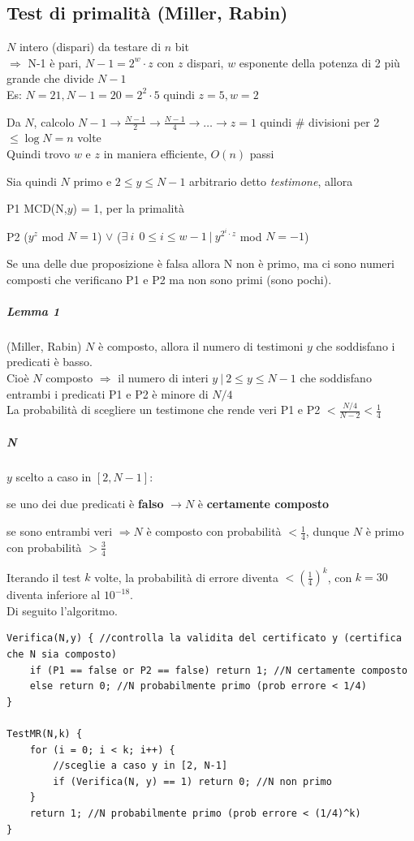 \documentclass[10pt]{book}
\begin{document}
\subsection{Test di primalità (Miller, Rabin)}
\begin{list}{}{}
	\item $N$ intero (dispari) da testare di $n$ bit\\
	$\Rightarrow$ N-1 è pari, $N-1 = 2^w \cdot z$ con $z$ dispari, $w$ esponente della potenza di 2 più grande che divide $N-1$\\
	Es: $N=21, N-1=20 = 2^2\cdot 5$ quindi $z=5, w=2$
	\item Da $N$, calcolo $N-1\rightarrow\frac{N-1}{2}\rightarrow\frac{N-1}{4}\rightarrow\ldots\rightarrow z = 1$ quindi \# divisioni per 2 $\leq\log N = n$ volte\\
	Quindi trovo $w$ e $z$ in maniera efficiente, $O(n)$ passi
	\item Sia quindi $N$ primo e $2\leq y \leq N-1$ arbitrario detto \textit{testimone}, allora
	\begin{list}{}{}
		\item[P1] MCD(N,$y$) = 1, per la primalità
		\item[P2] ($y^z$ mod $N = 1$) $\vee$ ($\exists\:i\:\:0\leq i \leq w-1\:|\:y^{2^i \cdot z}$ mod $N = -1$)
	\end{list}
	Se una delle due proposizione è falsa allora N non è primo, ma ci sono numeri composti che verificano P1 e P2 ma non sono primi (sono pochi).
\end{list}
\subparagraph{Lemma 1} (Miller, Rabin) $N$ è composto, allora il numero di testimoni $y$ che soddisfano i predicati è basso.\\
Cioè $N$ composto $\Rightarrow$ il numero di interi $y\:|\:2\leq y \leq N-1$ che soddisfano entrambi i predicati P1 e P2 è minore di $N/4$\\
La probabilità di scegliere un testimone che rende veri P1 e P2 $< \frac{N/4}{N-2} < \frac{1}{4}$
\subparagraph{N} $y$ scelto a caso in $[2, N-1]$:
\begin{list}{}{}
	\item se uno dei due predicati è \textbf{falso} $\rightarrow N$ è \textbf{certamente composto}
	\item se sono entrambi veri $\Rightarrow N$ è composto con probabilità $< \frac{1}{4}$, dunque $N$ è primo con probabilità $> \frac{3}{4}$
\end{list}
Iterando il test $k$ volte, la probabilità di errore diventa $< \left(\frac{1}{4}\right)^k$, con $k=30$ diventa inferiore al $10^{-18}$.\\
Di seguito l'algoritmo.
\begin{lstlisting}
Verifica(N,y) { //controlla la validita del certificato y (certifica che N sia composto)
	if (P1 == false or P2 == false) return 1; //N certamente composto
	else return 0; //N probabilmente primo (prob errore < 1/4)
}

TestMR(N,k) {
	for (i = 0; i < k; i++) {
		//sceglie a caso y in [2, N-1]
		if (Verifica(N, y) == 1) return 0; //N non primo
	}
	return 1; //N probabilmente primo (prob errore < (1/4)^k)
}
\end{lstlisting}
\end{document}
